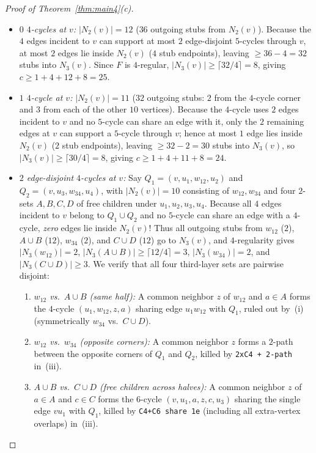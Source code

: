 \documentclass[11pt,reqno]{amsart}
\theoremstyle{plain}
\theoremstyle{definition}
\theoremstyle{remark}
\DeclareRobustCommand{\_}{\ifmmode\text{\textunderscore}\else\textunderscore\allowbreak\fi}
\begin{document}
\begin{proof}[Proof of Theorem~\ref{thm:main4}(c)]
\begin{itemize}[leftmargin=1.6em]
  \begin{itemize}[leftmargin=1.4em]
    \item \emph{$0$ $4$-cycles at $v$:} $|N_2(v)| = 12$ ($36$ outgoing stubs from $N_2(v)$). Because the $4$ edges incident to $v$ can support at most $2$ edge-disjoint $5$-cycles through $v$, at most $2$ edges lie inside $N_2(v)$ ($4$ stub endpoints), leaving $\ge 36 - 4 = 32$ stubs into $N_3(v)$. Since $F$ is $4$-regular, $|N_3(v)| \ge \lceil 32 / 4 \rceil = 8$, giving $c \ge 1 + 4 + 12 + 8 = 25$.
    \item \emph{$1$ $4$-cycle at $v$:} $|N_2(v)| = 11$ ($32$ outgoing stubs: $2$ from the $4$-cycle corner and $3$ from each of the other $10$ vertices). Because the $4$-cycle uses $2$ edges incident to $v$ and no $5$-cycle can share an edge with it, only the $2$ remaining edges at $v$ can support a $5$-cycle through $v$; hence at most $1$ edge lies inside $N_2(v)$ ($2$ stub endpoints), leaving $\ge 32 - 2 = 30$ stubs into $N_3(v)$, so $|N_3(v)| \ge \lceil 30 / 4 \rceil = 8$, giving $c \ge 1 + 4 + 11 + 8 = 24$.
    \item \emph{$2$ edge-disjoint $4$-cycles at $v$:} Say $Q_1 = (v, u_1, w_{12}, u_2)$ and $Q_2 = (v, u_3, w_{34}, u_4)$, with $|N_2(v)| = 10$ consisting of $w_{12}, w_{34}$ and four $2$-sets $A, B, C, D$ of free children under $u_1, u_2, u_3, u_4$. Because all $4$ edges incident to $v$ belong to $Q_1 \cup Q_2$ and no $5$-cycle can share an edge with a $4$-cycle, \emph{zero} edges lie inside $N_2(v)$! Thus all outgoing stubs from $w_{12}$ ($2$), $A \cup B$ ($12$), $w_{34}$ ($2$), and $C \cup D$ ($12$) go to $N_3(v)$, and $4$-regularity gives $|N_3(w_{12})| = 2$, $|N_3(A \cup B)| \ge \lceil 12/4 \rceil = 3$, $|N_3(w_{34})| = 2$, and $|N_3(C \cup D)| \ge 3$. We verify that all four third-layer sets are pairwise disjoint:
    \begin{enumerate}[label=(\alph*),leftmargin=1.6em]
      \item \emph{$w_{12}$ vs.\ $A \cup B$ (same half):} A common neighbor $z$ of $w_{12}$ and $a \in A$ forms the $4$-cycle $(u_1, w_{12}, z, a)$ sharing edge $u_1 w_{12}$ with $Q_1$, ruled out by~(i) (symmetrically $w_{34}$ vs.\ $C \cup D$).
      \item \emph{$w_{12}$ vs.\ $w_{34}$ (opposite corners):} A common neighbor $z$ forms a $2$-path between the opposite corners of $Q_1$ and $Q_2$, killed by \texttt{2xC4 + 2-path} in~(iii).
      \item \emph{$A \cup B$ vs.\ $C \cup D$ (free children across halves):} A common neighbor $z$ of $a \in A$ and $c \in C$ forms the $6$-cycle $(v, u_1, a, z, c, u_3)$ sharing the single edge $v u_1$ with $Q_1$, killed by \texttt{C4+C6 share 1e} (including all extra-vertex overlaps) in~(iii).

\end{enumerate}
\end{itemize}
\end{itemize}
\end{proof}
\end{document}
